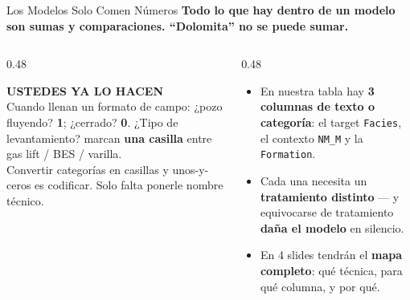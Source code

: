 \documentclass[aspectratio=169, 11pt]{beamer}
\begin{document}
\begin{frame}[shrink=8]{Los Modelos Solo Comen Números}
  \vspace{-4pt}
  {\small\color{arcaDark}\bfseries
    Todo lo que hay dentro de un modelo son sumas y comparaciones. ``Dolomita'' no se puede sumar.}

  \vspace{8pt}
  \begin{columns}[T]
    \begin{column}{0.48\textwidth}
      \begin{tcolorbox}[colback=arcaGray, colframe=arcaRed, boxrule=0pt, leftrule=3pt,
        arc=3pt, left=6pt, right=6pt, top=5pt, bottom=5pt]
        {\scriptsize\color{arcaRed}\bfseries\faKeyboard\hspace{4pt}USTEDES YA LO HACEN}\\[4pt]
        {\scriptsize\color{textMuted}
          Cuando llenan un formato de campo:
          ¿pozo fluyendo? \textbf{1}; ¿cerrado? \textbf{0}.
          ¿Tipo de levantamiento? marcan \textbf{una casilla}
          entre gas lift / BES / varilla.\\[3pt]
          Convertir categorías en casillas y unos-y-ceros
          es codificar. Solo falta ponerle nombre técnico.}
      \end{tcolorbox}
    \end{column}
    \begin{column}{0.48\textwidth}
      {\footnotesize\color{textMuted}
      \begin{itemize}\setlength{\itemsep}{5pt}
        \item[{\color{arcaRed}\scriptsize\faArrowRight}]
          En nuestra tabla hay \textbf{3 columnas de texto o categoría}:
          el target \texttt{Facies}, el contexto \texttt{NM\_M}
          y la \texttt{Formation}.
        \item[{\color{arcaRed}\scriptsize\faArrowRight}]
          Cada una necesita un \textbf{tratamiento distinto} ---
          y equivocarse de tratamiento \textbf{daña el modelo}
          en silencio.
        \item[{\color{codeGreen}\scriptsize\faCheck}]
          En 4 slides tendrán el \textbf{mapa completo}: qué técnica,
          para qué columna, y por qué.
      \end{itemize}
      }
    \end{column}
  \end{columns}
\end{frame}
\end{document}
